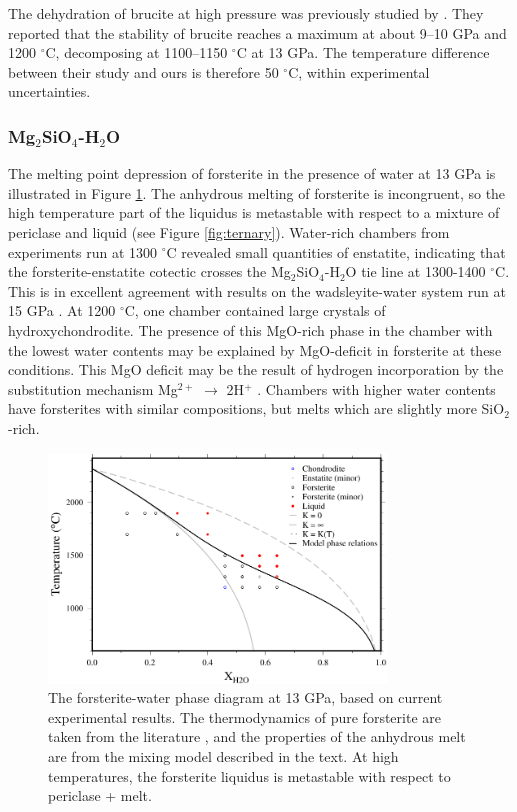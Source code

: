 \documentclass[review]{elsarticle}
\begin{document}
The dehydration of brucite at high pressure was previously studied by \cite{FIYKFO2005}. They reported that the stability of brucite reaches a maximum at about 9--10 GPa and 1200 $^{\circ}$C, decomposing at 1100--1150 $^{\circ}$C at 13 GPa. The temperature difference between their study and ours is therefore 50 $^{\circ}$C, within experimental uncertainties. 


\clearpage
\subsubsection{Mg$_2$SiO$_4$-H$_2$O}
The melting point depression of forsterite in the presence of water at 13 GPa is illustrated in Figure \ref{fig:foH}. The anhydrous melting of forsterite is incongruent, so the high temperature part of the liquidus is metastable with respect to a mixture of periclase and liquid (see Figure \ref{fig:ternary}). Water-rich chambers from experiments run at 1300 $^{\circ}$C revealed small quantities of enstatite, indicating that the forsterite-enstatite cotectic crosses the Mg$_2$SiO$_4$-H$_2$O tie line at 1300-1400 $^{\circ}$C. This is in excellent agreement with results on the wadsleyite-water system run at 15 GPa \citep{DDFK2005, LSOK2011}. At 1200 $^{\circ}$C, one chamber contained large crystals of hydroxychondrodite. The presence of this MgO-rich phase in the chamber with the lowest water contents may be explained by MgO-deficit in forsterite at these conditions. This MgO deficit may be the result of hydrogen incorporation by the substitution mechanism Mg$^{2+}$ $\rightarrow$ 2H$^+$ \citep{KB2006}. Chambers with higher water contents have forsterites with similar compositions, but melts which are slightly more SiO$_2$-rich.

\begin{figure}[ht!]
  \centering
      \includegraphics[width=0.8\textwidth]{figures/forsterite}
      \caption{The forsterite-water phase diagram at 13 GPa, based on current experimental results. The thermodynamics of pure forsterite are taken from the literature \citep{SLB2011}, and the properties of the anhydrous melt are from the mixing model described in the text. At high temperatures, the forsterite liquidus is metastable with respect to periclase + melt.}
  \label{fig:foH}
\end{figure}
\clearpage
\end{document}
